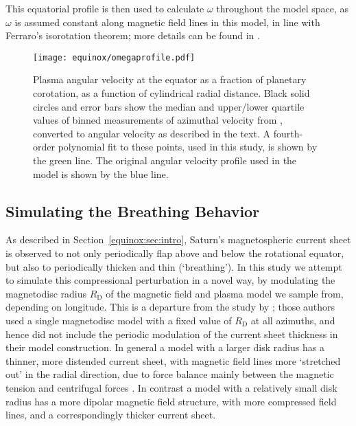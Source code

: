 This equatorial profile is then used to calculate $\omega$ throughout the model space, as $\omega$ is assumed constant along magnetic field lines in this model, in line with Ferraro's isorotation theorem; more details can be found in {\citet{achilleos2010a,caudal1986}}.
\begin{figure}
\centering
\texttt{[image: equinox/omegaprofile.pdf]}
\caption[Equatorial profile of plasma angular velocity from \citet{wilson2017}, with best fit polynomial.]{Plasma angular velocity at the equator as a fraction of planetary corotation, as a function of cylindrical radial distance. Black solid circles and error bars show the median and upper/lower quartile values of binned measurements of azimuthal velocity from \citet{wilson2017}, converted to angular velocity as described in the text. A fourth-order polynomial fit to these points, used in this study, is shown by the green line. The original angular velocity profile used in the \citet{achilleos2010a} model is shown by the blue line.}
\label{equinox:fig:omegaprofile}
\end{figure}

\subsection{Simulating the Breathing Behavior}\label{equinox:sec:simulatingbreathing}
As described in Section~\ref{equinox:sec:intro}, Saturn's magnetospheric current sheet is observed to not only periodically flap above and below the rotational equator, but also to periodically thicken and thin (`breathing'). In this study we attempt to simulate this compressional perturbation in a novel way, by modulating the magnetodisc radius $R_\mathrm{D}$ of the magnetic field and plasma model we sample from, depending on longitude. This is a departure from the study by {\citet{achilleos2014}}; those authors used a single magnetodisc model with a fixed value of $R_\mathrm{D}$ at all azimuths, and hence did not include the periodic modulation of the current sheet thickness in their model construction. In general a model with a larger disk radius has a thinner, more distended current sheet, with magnetic field lines more `stretched out' in the radial direction, due to force balance mainly between the magnetic tension and centrifugal forces \citep{achilleos2010a,sorba2017}. In contrast a model with a relatively small disk radius has a more dipolar magnetic field structure, with more compressed field lines, and a correspondingly thicker current sheet.

